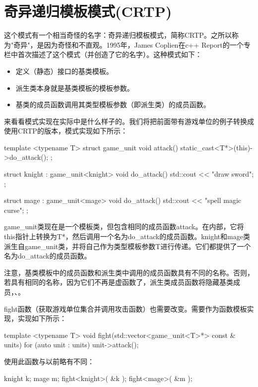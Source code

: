 \section{奇异递归模板模式(CRTP)}

这个模式有一个相当奇怪的名字：奇异递归模板模式，简称CRTP。之所以称为"奇异"，是因为奇怪和不直观。1995年，James Coplien在c++ Report的一个专栏中首次描述了这个模式（并创造了它的名字）。这种模式如下：

\begin{itemize}
\item
定义（静态）接口的基类模板。

\item
派生类本身就是基类模板的模板参数。

\item
基类的成员函数调用其类型模板参数（即派生类）的成员函数。
\end{itemize}

来看看模式实现在实际中是什么样子的。我们将把前面带有游戏单位的例子转换成使用CRTP的版本，模式实现如下所示：

\begin{cpp}
template <typename T>
struct game_unit
{
	void attack()
	{
		static_cast<T*>(this)->do_attack();
	}
};

struct knight : game_unit<knight>
{
	void do_attack()
	{ std::cout << "draw sword\n"; }
};

struct mage : game_unit<mage>
{
	void do_attack()
	{ std::cout << "spell magic curse\n"; }
};
\end{cpp}

game\_unit类现在是一个模板类，但包含相同的成员函数attack。在内部，它将this指针上转换为T*，然后调用一个名为do\_attack的成员函数。knight和mage类派生自game\_unit类，并将自己作为类型模板参数T进行传递。它们都提供了一个名为do\_attack的成员函数。

注意，基类模板中的成员函数和派生类中调用的成员函数具有不同的名称。否则，若具有相同的名称，因为它们不再是虚函数了，派生类成员函数将隐藏基类成员，、。

fight函数（获取游戏单位集合并调用攻击函数）也需要改变。需要作为函数模板实现，实现如下所示：

\begin{cpp}
template <typename T>
void fight(std::vector<game_unit<T>*> const & units)
{
	for (auto unit : units)
	{
		unit->attack();
	}
}
\end{cpp}

使用此函数与以前略有不同：

\begin{cpp}
knight k;
mage m;
fight<knight>({ &k });
fight<mage>({ &m });
\end{cpp}


